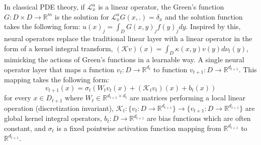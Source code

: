 \documentclass[12pt]{article}
\begin{document}
In classical PDE theory, if $\mathcal{L}_{x}^a$ is a linear operator, the Green's function \autocite{stakgold2011greens} $G: D \times D \to \mathbb{R}^m$ is the solution for $\mathcal{L}_{x}^aG(x, .) = \delta_x$ and the solution function takes the following form: $u(x)_j =\int_D G(x, y)_j f(y)_jdy$. Inspired by this, neural operators \autocite{kovachki2023neural} replace the traditional linear layer with a linear operator in the form of a kernel integral transform, $(\mathcal{K}v)(x) = \int_{D}\kappa(x, y)v(y)d\nu_t(y)$, mimicking the actions of Green's functions in a learnable way.  A single neural operator layer that maps a function $v_t: D \to \mathbb{R}^{d_t}$ to function $v_{t + 1}: D \to \mathbb{R}^{d_{t + 1}}$. This mapping takes the following form: $$v_{t + 1}(x) = \sigma_t\left(W_tv_t(x) + (\mathcal{K}_tv_t)(x) + b_t(x)\right)$$ for every $x \in D_{t + 1}$ where $W_t \in \mathbb{R}^{d_{t + 1} \times d_{t}}$ are matrices performing a local linear operation (discretization invariant), $\mathcal{K}_t: \{v_t: D \to \mathbb{R}^{d_{t + 1}}\} \to \{v_{t + 1}: D \to \mathbb{R}^{d_{t + 1}}\}$ are global kernel integral operators, $b_t: D \to \mathbb{R}^{d_{t + 1}}$ are bias functions which are often constant, and $\sigma_t$ is a fixed pointwise activation function mapping from $\mathbb{R}^{d_{t + 1}}$ to $\mathbb{R}^{d_{t + 1}}$.

\end{document}
